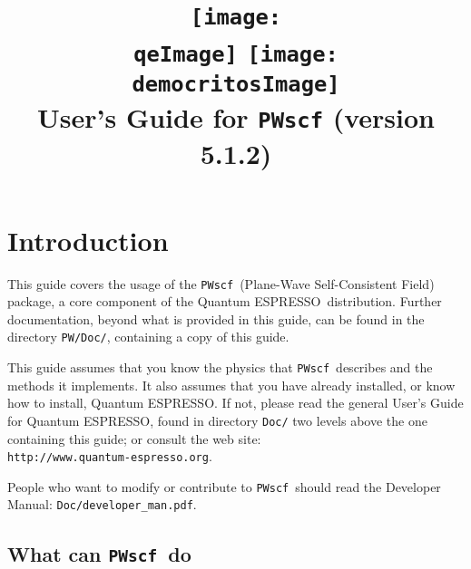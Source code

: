 \documentclass[12pt,a4paper]{article}
\def\version{5.1.2}
\def\PWscf{\texttt{PWscf}}
\def\qe{{\sc Quantum ESPRESSO}}
\begin{document}
 
\author{}
\date{}

\def\qeImage{../../Doc/quantum_espresso.pdf}
\def\democritosImage{../../Doc/democritos.pdf}

\begin{htmlonly}
\def\qeImage{../../Doc/quantum_espresso.png}
\def\democritosImage{../../Doc/democritos.png}
\end{htmlonly}

\title{
  \texttt{[image: \\qeImage]} \hskip 2cm
  \texttt{[image: \\democritosImage]}\\
  \vskip 1cm
  \Huge User's Guide for \PWscf\smallskip
  \Large (version \version)
}


\maketitle

\tableofcontents

\section{Introduction}

This guide covers the usage of the \PWscf\ 
(Plane-Wave Self-Consistent Field) package,
a core component of the \qe\ distribution.
Further documentation, beyond what is provided 
in this guide, can be found in the directory
\texttt{PW/Doc/}, containing a copy of this guide.

This guide assumes that you know the physics 
that \PWscf\ describes and the methods it implements.
It also assumes  that you have already installed,
or know how to install, \qe. If not, please read
the general User's Guide for \qe, found in 
directory \texttt{Doc/} two levels above the 
one containing this guide; or consult the web site:\\
\texttt{http://www.quantum-espresso.org}.

People who want to modify or contribute to 
\PWscf\ should read the Developer Manual: 
\texttt{Doc/developer\_man.pdf}.

\subsection{What can \PWscf\ do}
\end{document}
